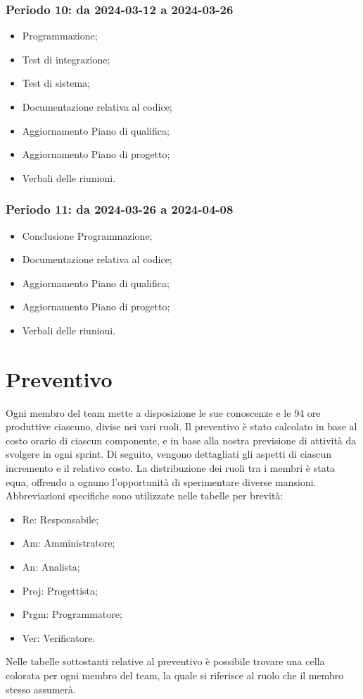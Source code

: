 \documentclass[10pt, a4paper]{article}
\begin{document}
{{{{{{{{\subsubsection{Periodo 10: da 2024-03-12 a 2024-03-26}
%
\begin{itemize}
    \item Programmazione;
    \item Test di integrazione;
    \item Test di sistema;
    \item Documentazione relativa al codice;
    \item Aggiornamento Piano di qualifica;
    \item Aggiornamento Piano di progetto;
    \item Verbali delle riunioni.
\end{itemize}
\subsubsection{Periodo 11: da 2024-03-26 a 2024-04-08}
%
\begin{itemize}
    \item Conclusione Programmazione;
    \item Documentazione relativa al codice;
    \item Aggiornamento Piano di qualifica;
    \item Aggiornamento Piano di progetto;
    \item Verbali delle riunioni.
\end{itemize}


\newpage
\section{Preventivo}
Ogni membro del team mette a disposizione le sue conoscenze e le 94 ore produttive ciascuno, divise nei vari ruoli. Il preventivo è stato calcolato in base al costo orario di ciascun componente, e in base alla nostra previsione di attività da svolgere in ogni sprint. Di seguito, vengono dettagliati gli aspetti di ciascun incremento e il relativo costo. La distribuzione dei ruoli tra i membri è stata equa, offrendo a ognuno l'opportunità di sperimentare diverse mansioni. Abbreviazioni specifiche sono utilizzate nelle tabelle per brevità:
\begin{itemize}
    \item Re: Responsabile;
    \item Am: Amministratore;
    \item An: Analista;
    \item Proj: Progettista;
    \item Prgm: Programmatore;
    \item Ver: Verificatore.
\end{itemize}
Nelle tabelle sottostanti relative al preventivo è possibile trovare una cella colorata per ogni membro del team, la quale si riferisce al ruolo che il membro stesso assumerà.
}}}}}}}}
\end{document}
